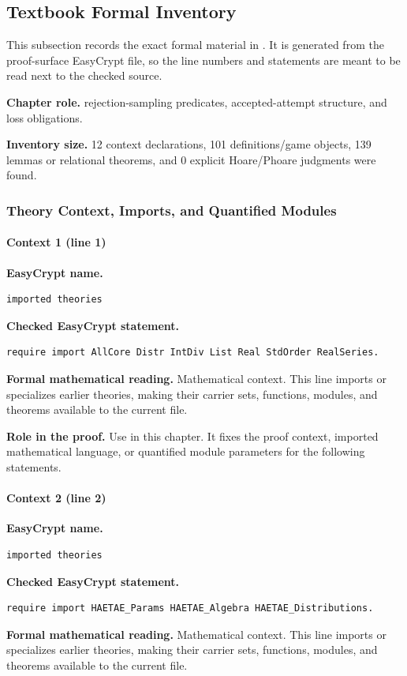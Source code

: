 \subsection*{Textbook Formal Inventory}
This subsection records the exact formal material in .  It is generated from the proof-surface EasyCrypt file, so the line numbers and statements are meant to be read next to the checked source.

\noindent\textbf{Chapter role.} rejection-sampling predicates, accepted-attempt structure, and loss obligations.

\noindent\textbf{Inventory size.} 12 context declarations, 101 definitions/game objects, 139 lemmas or relational theorems, and 0 explicit Hoare/Phoare judgments were found.

\subsubsection*{Theory Context, Imports, and Quantified Modules}
\paragraph{Context 1 (line 1)}
\noindent\textbf{EasyCrypt name.}
\begin{lstlisting}[language=EasyCrypt,basicstyle=\ttfamily\scriptsize]
imported theories
\end{lstlisting}
\noindent\textbf{Checked EasyCrypt statement.}
\begin{lstlisting}[language=EasyCrypt,basicstyle=\ttfamily\scriptsize]
require import AllCore Distr IntDiv List Real StdOrder RealSeries.
\end{lstlisting}
\noindent\textbf{Formal mathematical reading.}
Mathematical context. This line imports or specializes earlier theories, making their carrier sets, functions, modules, and theorems available to the current file.

\noindent\textbf{Role in the proof.}
Use in this chapter. It fixes the proof context, imported mathematical language, or quantified module parameters for the following statements.

\paragraph{Context 2 (line 2)}
\noindent\textbf{EasyCrypt name.}
\begin{lstlisting}[language=EasyCrypt,basicstyle=\ttfamily\scriptsize]
imported theories
\end{lstlisting}
\noindent\textbf{Checked EasyCrypt statement.}
\begin{lstlisting}[language=EasyCrypt,basicstyle=\ttfamily\scriptsize]
require import HAETAE_Params HAETAE_Algebra HAETAE_Distributions.
\end{lstlisting}
\noindent\textbf{Formal mathematical reading.}
Mathematical context. This line imports or specializes earlier theories, making their carrier sets, functions, modules, and theorems available to the current file.

